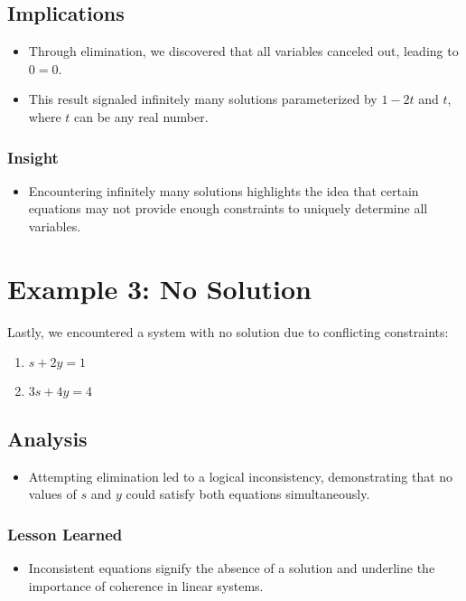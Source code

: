 \documentclass{article}
\begin{document}
\subsection{Implications}
\begin{itemize}
    \item Through elimination, we discovered that all variables canceled out, leading to $0 = 0$.
    \item This result signaled infinitely many solutions parameterized by $1 - 2t$ and $t$, where $t$ can be any real number.
\end{itemize}

\subsubsection{Insight}
\begin{itemize}
    \item Encountering infinitely many solutions highlights the idea that certain equations may not provide enough constraints to uniquely determine all variables.
\end{itemize}

\section{Example 3: No Solution}
Lastly, we encountered a system with no solution due to conflicting constraints:
\begin{enumerate}
    \item $s + 2y = 1$
    \item $3s + 4y = 4$
\end{enumerate}

\subsection{Analysis}
\begin{itemize}
    \item Attempting elimination led to a logical inconsistency, demonstrating that no values of $s$ and $y$ could satisfy both equations simultaneously.
\end{itemize}

\subsubsection{Lesson Learned}
\begin{itemize}
    \item Inconsistent equations signify the absence of a solution and underline the importance of coherence in linear systems.
\end{itemize}
\end{document}
